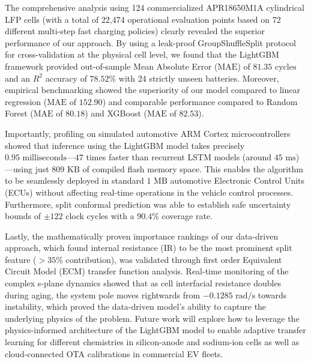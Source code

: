 \documentclass[pdflatex,sn-mathphys-num]{sn-jnl}%
\theoremstyle{thmstyleone}%
\theoremstyle{thmstyletwo}%
\theoremstyle{thmstylethree}%
\begin{document}
The comprehensive analysis using 124 commercialized APR18650M1A cylindrical LFP cells (with a total of 22,474 operational evaluation points based on 72 different multi-step fast charging policies) clearly revealed the superior performance of our approach. By using a leak-proof GroupShuffleSplit protocol for cross-validation at the physical cell level, we found that the LightGBM framework provided out-of-sample Mean Absolute Error ($\text{MAE}$) of $81.35\text{ cycles}$ and an $R^2$ accuracy of $78.52\%$ with 24 strictly unseen batteries. Moreover, empirical benchmarking showed the superiority of our model compared to linear regression ($\text{MAE}$ of $152.90$) and comparable performance compared to Random Forest ($\text{MAE}$ of $80.18$) and XGBoost ($\text{MAE}$ of $82.53$).

Importantly, profiling on simulated automotive ARM Cortex microcontrollers showed that inference using the LightGBM model takes precisely $0.95\text{ milliseconds}$---$47$ times faster than recurrent LSTM models (around $45\text{ ms}$)---using just $809\text{ KB}$ of compiled flash memory space. This enables the algorithm to be seamlessly deployed in standard $1\text{ MB}$ automotive Electronic Control Units (ECUs) without affecting real-time operations in the vehicle control processes. Furthermore, split conformal prediction was able to establish safe uncertainty bounds of $\pm 122$ clock cycles with a $90.4\%$ coverage rate.

Lastly, the mathematically proven importance rankings of our data-driven approach, which found internal resistance ($\text{IR}$) to be the most prominent split feature ($> 35\%$ contribution), was validated through first order Equivalent Circuit Model ($\text{ECM}$) transfer function analysis. Real-time monitoring of the complex s-plane dynamics showed that as cell interfacial resistance doubles during aging, the system pole moves rightwards from $-0.1285\text{ rad/s}$ towards instability, which proved the data-driven model's ability to capture the underlying physics of the problem. Future work will explore how to leverage the physics-informed architecture of the LightGBM model to enable adaptive transfer learning for different chemistries in silicon-anode and sodium-ion cells as well as cloud-connected OTA calibrations in commercial EV fleets.

\nocite{*}
\end{document}
